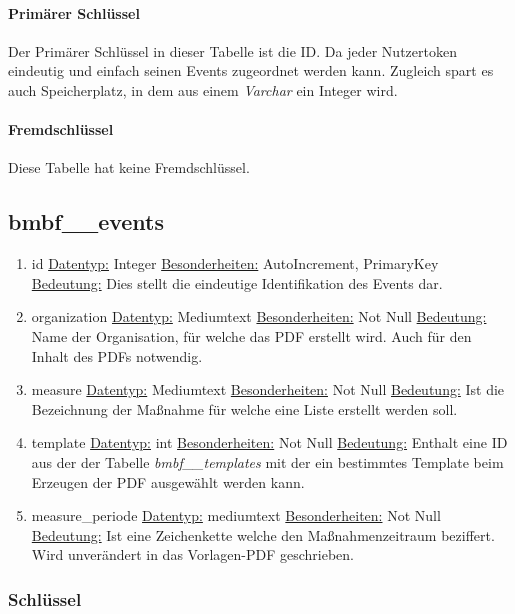 \documentclass[12pt,parskip=full, pagea4]{scrreprt}
\begin{document}
				\paragraph{Prim\"arer Schl\"ussel}Der Primärer Schlüssel in dieser Tabelle ist die ID. Da jeder Nutzertoken eindeutig und einfach seinen Events zugeordnet werden kann. Zugleich spart es auch Speicherplatz, in dem aus einem \textit{Varchar} ein Integer wird.
				\paragraph{Fremdschl\"ussel}Diese Tabelle hat keine Fremdschl\"ussel.
			\subsection{bmbf\_\_events}
			\begin{enumerate}
				\item id
				\subitem \underline{Datentyp:} Integer
				\subitem \underline{Besonderheiten:} AutoIncrement, PrimaryKey
				\subitem \underline{Bedeutung:} Dies stellt die eindeutige Identifikation des Events dar.
				\item organization
				\subitem \underline{Datentyp:} Mediumtext
				\subitem \underline{Besonderheiten:} Not Null
				\subitem \underline{Bedeutung:} Name der Organisation, für welche das PDF erstellt wird. Auch für den Inhalt des PDFs notwendig.
				\item measure
				\subitem \underline{Datentyp:} Mediumtext
				\subitem \underline{Besonderheiten:} Not Null
				\subitem \underline{Bedeutung:} Ist die Bezeichnung der Maßnahme für welche eine Liste erstellt werden soll.
				\item template
				\subitem \underline{Datentyp:} int
				\subitem \underline{Besonderheiten:} Not Null
				\subitem \underline{Bedeutung:} Enthalt eine ID aus der der Tabelle  \textit{bmbf\_\_templates} mit der ein bestimmtes Template beim Erzeugen der PDF ausgewählt werden kann.
				\item measure\_periode
				\subitem \underline{Datentyp:} mediumtext
				\subitem \underline{Besonderheiten:} Not Null
				\subitem \underline{Bedeutung:} Ist eine Zeichenkette welche den Maßnahmenzeitraum beziffert. Wird unverändert in das Vorlagen-PDF geschrieben.
			\end{enumerate}
			\leftskip=0cm
				\subsubsection{Schl\"ussel}
\end{document}
